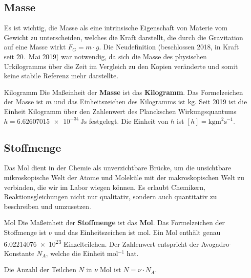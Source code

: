 \subsection{Masse}\label{subsec: SI-Masse}
Es ist wichtig, die Masse als eine intrinsische Eigenschaft von Materie vom Gewicht zu unterscheiden, welches die Kraft darstellt, die durch die Gravitation auf eine Masse wirkt $F_G = m\cdot g$. Die Neudefinition (beschlossen 2018, in Kraft seit 20.~Mai 2019) war notwendig, da sich die Masse des physischen Urkilogramms über die Zeit im Vergleich zu den Kopien veränderte und somit keine stabile Referenz mehr darstellte.
\begin{importantbox}[]{Kilogramm}
Die Maßeinheit der \textbf{Masse} ist das \textbf{Kilogramm}. Das Formelzeichen der Masse ist $m$ und das Einheitszeichen des Kilogramms ist $\si{\kilo\gram}$. 
\tcblower
Seit 2019 ist die Einheit Kilogramm über den Zahlenwert des Planckschen Wirkungsquantums $h = \SI{6.62607015e-34}{\joule\second}$ festgelegt\footnotemark{}. Die Einheit von $h$ ist $[h] = \si{\kilo\gram \meter^2 \second^{-1}}$.
\end{importantbox}

\subsection{Stoffmenge}\label{subsec: SI-Stoffmenge}
Das Mol dient in der Chemie als unverzichtbare Brücke, um die unsichtbare mikroskopische Welt der Atome und Moleküle mit der makroskopischen Welt zu verbinden, die wir im Labor wiegen können. Es erlaubt Chemikern, Reaktionsgleichungen nicht nur qualitativ, sondern auch quantitativ zu beschreiben und umzusetzen.
\begin{importantbox}[]{Mol}
Die Maßeinheit der \textbf{Stoffmenge} ist das \textbf{Mol}. Das Formelzeichen der Stoffmenge ist $\nu$ und das Einheitszeichen ist \si{\mol}.
\tcblower
Ein Mol enthält genau \num{6.02214076e23} Einzelteilchen. Der Zahlenwert entspricht der Avogadro-Konstante $N_A$, welche die Einheit $\si{\mol^{-1}}$ hat.\footnotemark{}
\end{importantbox}
Die Anzahl der Teilchen $N$ in $\nu$ Mol ist $N = \nu \cdot N_A$.

